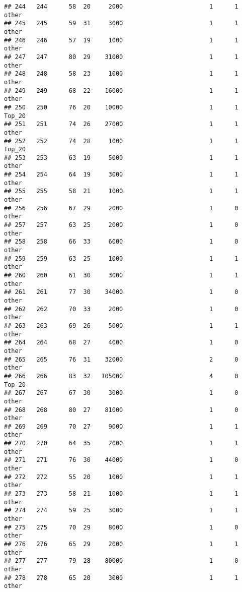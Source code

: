 \documentclass[
]{article}
\begin{document}
\begin{verbatim}
## 244   244      58  20     2000                        1      1    other
## 245   245      59  31     3000                        1      1    other
## 246   246      57  19     1000                        1      1    other
## 247   247      80  29    31000                        1      1    other
## 248   248      58  23     1000                        1      1    other
## 249   249      68  22    16000                        1      1    other
## 250   250      76  20    10000                        1      1   Top_20
## 251   251      74  26    27000                        1      1    other
## 252   252      74  28     1000                        1      1   Top_20
## 253   253      63  19     5000                        1      1    other
## 254   254      64  19     3000                        1      1    other
## 255   255      58  21     1000                        1      1    other
## 256   256      67  29     2000                        1      0    other
## 257   257      63  25     2000                        1      0    other
## 258   258      66  33     6000                        1      0    other
## 259   259      63  25     1000                        1      1    other
## 260   260      61  30     3000                        1      1    other
## 261   261      77  30    34000                        1      0    other
## 262   262      70  33     2000                        1      0    other
## 263   263      69  26     5000                        1      1    other
## 264   264      68  27     4000                        1      0    other
## 265   265      76  31    32000                        2      0    other
## 266   266      83  32   105000                        4      0   Top_20
## 267   267      67  30     3000                        1      0    other
## 268   268      80  27    81000                        1      0    other
## 269   269      70  27     9000                        1      1    other
## 270   270      64  35     2000                        1      1    other
## 271   271      76  30    44000                        1      0    other
## 272   272      55  20     1000                        1      1    other
## 273   273      58  21     1000                        1      1    other
## 274   274      59  25     3000                        1      1    other
## 275   275      70  29     8000                        1      0    other
## 276   276      65  29     2000                        1      1    other
## 277   277      79  28    80000                        1      0    other
## 278   278      65  20     3000                        1      1    other

\end{verbatim}
\end{document}
